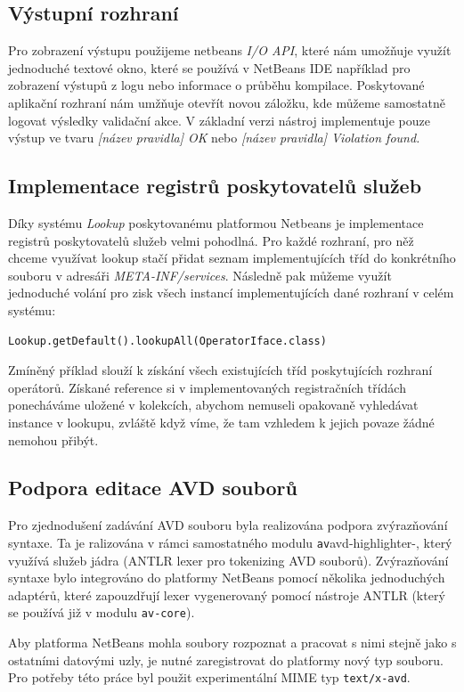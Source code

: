 \subsection{Výstupní rozhraní}
Pro zobrazení výstupu použijeme netbeans \emph{I/O API}, které nám umožňuje využít jednoduché textové okno, které se používá v NetBeans IDE například pro zobrazení výstupů z logu nebo informace o průběhu kompilace. Poskytované aplikační rozhraní nám umžňuje otevřít novou záložku, kde můžeme samostatně logovat výsledky validační akce. V základní verzi nástroj implementuje pouze výstup ve tvaru \emph{[název pravidla] OK} nebo \emph{[název pravidla] Violation found.}

\subsection{Implementace registrů poskytovatelů služeb}
Díky systému \emph{Lookup} poskytovanému platformou Netbeans je implementace registrů poskytovatelů služeb velmi pohodlná. Pro každé rozhraní, pro něž chceme využívat lookup stačí přidat seznam implementujících tříd do konkrétního souboru v adresáři \emph{META-INF/services}. Následně pak můžeme využít jednoduché volání pro zisk všech instancí implementujících dané rozhraní v celém systému:

\begin{verbatim}
Lookup.getDefault().lookupAll(OperatorIface.class)
\end{verbatim}

Zmíněný příklad slouží k získání všech existujících tříd poskytujících rozhraní operátorů. Získané reference si v implementovaných registračních třídách ponecháváme uložené v kolekcích, abychom nemuseli opakovaně vyhledávat instance v lookupu, zvláště když víme, že tam vzhledem k jejich povaze žádné nemohou přibýt.

\subsection{Podpora editace AVD souborů}
Pro zjednodušení zadávání AVD souboru byla realizována podpora zvýrazňování syntaxe. Ta je ralizována v rámci samostatného modulu \verb-av-avd-highlighter-, který využívá služeb jádra (ANTLR lexer pro tokenizing AVD souborů). Zvýrazňování syntaxe bylo integrováno do platformy NetBeans pomocí několika jednoduchých adaptérů, které zapouzdřují lexer vygenerovaný pomocí nástroje ANTLR (který se používá již v modulu \verb+av-core+).

Aby platforma NetBeans mohla soubory rozpoznat a pracovat s nimi stejně jako s ostatními datovými uzly, je nutné zaregistrovat do platformy nový typ souboru. Pro potřeby této práce byl použit experimentální MIME typ \verb+text/x-avd+.
